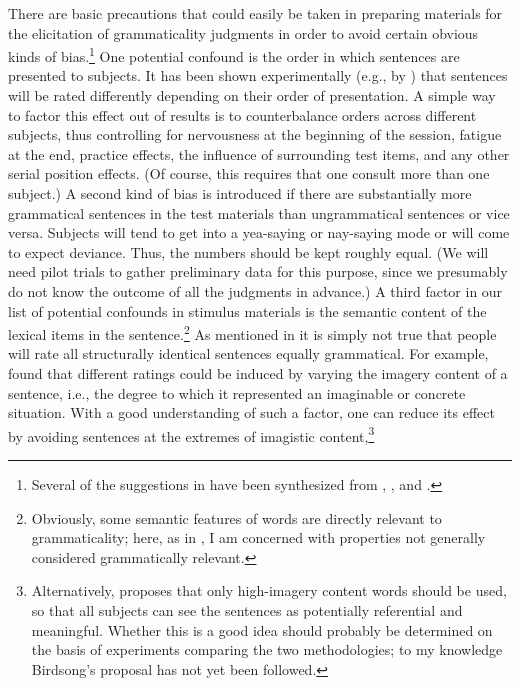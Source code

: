  There are basic precautions that could easily be taken in preparing materials for the elicitation of grammaticality judgments in order to avoid certain obvious kinds of bias.\footnote{Several of the suggestions in  have been synthesized from \citet{Birdsong1989}, \citet{RayEtAl1988}, and \citet{Snow1975}.}
  One potential confound is the order in which sentences are presented to subjects. It has been shown experimentally (e.g., by \citet{Greenbaum1973}) that sentences will be rated differently depending on their order of presentation. A simple way to factor this effect out of results is to counterbalance orders across different subjects, thus controlling for nervousness at the beginning of the session, fatigue at the end, practice effects, the influence of surrounding test items, and any other serial position effects. (Of course, this requires that one consult more than one subject.) A second kind of bias is introduced if there are substantially more grammatical sentences in the test materials than ungrammatical sentences or vice versa. Subjects will tend to get into a yea-saying or nay-saying mode or will come to expect deviance. Thus, the numbers should be kept roughly equal. (We will need pilot trials to gather preliminary data for this purpose, since we presumably do not know the outcome of all the judgments in advance.) A third factor in our list of potential confounds in stimulus materials is the semantic content of the lexical items in the sentence.\footnote{Obviously, some semantic features of words are directly relevant to grammaticality; here, as in , I am concerned with properties not generally considered grammatically relevant.}
  As mentioned in  it is simply not true that people will rate all structurally identical sentences equally grammatical. For example, \citet{LeveltEtAl1977} found that different ratings could be induced by varying the imagery content of a sentence, i.e., the degree to which it represented an imaginable or concrete situation. With a good understanding of such a factor, one can reduce its effect by avoiding sentences at the extremes of imagistic content,\footnote{Alternatively, \citet{Birdsong1989} proposes that only high-imagery content words should be used, so that all subjects can see the sentences as potentially referential and meaningful. Whether this is a good idea should probably be determined on the basis of experiments comparing the two methodologies; to my knowledge Birdsong's proposal has not yet been followed.}
